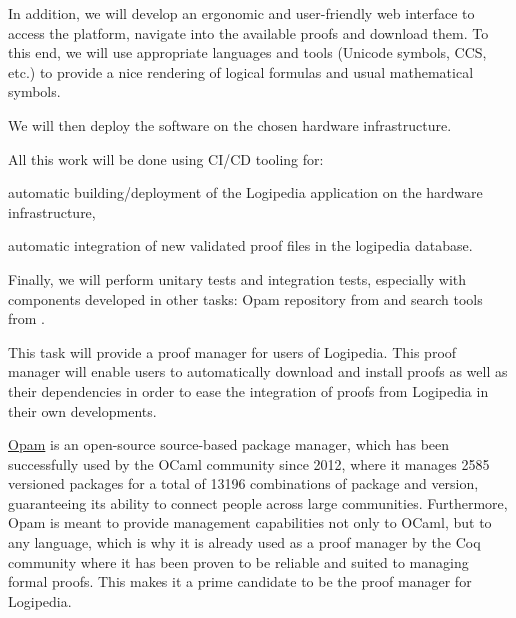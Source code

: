 \begin{workpackage}[id=access,type=RTD,wphases=1-48,
  short=Access,%
  title={Access},
  lead=Inr,InrRM=48,OcaRM=6,EduRM=12]
\begin{tasklist}
\begin{task}[id=web,
      title=Giving access to the infrastructure on the world-wide web,
      lead=Inr,InrRM=12,wphases=7-24]
    In addition, we will develop an ergonomic and user-friendly web
    interface to access the platform, navigate into the available
    proofs and download them. To this end, we will use appropriate
    languages and tools (Unicode symbols, CCS, etc.) to provide a nice
    rendering of logical formulas and usual mathematical symbols.
    
    We will then deploy the software on the chosen hardware
    infrastructure.

    All this work will be done using CI/CD tooling for:
    \begin{compactitem}
    \item automatic building/deployment of the Logipedia application
      on the hardware infrastructure,
    \item automatic integration of new validated proof files in the
      logipedia database.
    \end{compactitem}

    Finally, we will perform unitary tests and integration tests,
    especially with components developed in other tasks: Opam
    repository from  and search tools from
    .
  \end{task}

  \begin{task}[id=opam,
      title=Giving access to the infrastructure in proof systems,
      lead=Oca,OcaRM=6,wphases=15-24]
    This task will provide a proof manager for users of Logipedia. This proof
    manager will enable users to automatically download and install
    proofs as well as their dependencies in order to ease the
    integration of proofs from Logipedia in their own developments.

    \href{https://opam.ocaml.org/}{Opam} is an open-source source-based package manager,
    which has been successfully used by the OCaml community since
    2012, where it manages 2585 versioned packages for a total of
    13196 combinations of package and version, guaranteeing its
    ability to connect people across large communities. Furthermore,
    Opam is meant to provide management capabilities not only to
    OCaml, but to any language, which is why it is already used as a
    proof manager by the Coq community where it has been proven to be
    reliable and suited to managing formal proofs. This makes it a
    prime candidate to be the proof manager for Logipedia.


\end{task}
\end{tasklist}
\end{workpackage}

